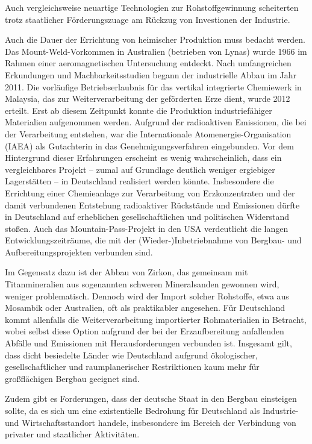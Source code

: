 \documentclass[12pt,a4paper,oneside]{book} %
\begin{document}
Auch vergleichsweise neuartige Technologien zur Rohstoffgewinnung scheiterten trotz staatlicher Förderungszuage am Rückzug von Investionen der Industrie.

Auch die Dauer der Errichtung von heimischer Produktion muss bedacht werden. Das Mount-Weld-Vorkommen in Australien (betrieben von Lynas) wurde 1966 im Rahmen einer aeromagnetischen Untersuchung entdeckt. Nach umfangreichen Erkundungen und Machbarkeitsstudien begann der industrielle Abbau im Jahr 2011. Die vorläufige Betriebserlaubnis für das vertikal integrierte Chemiewerk in Malaysia, das zur Weiterverarbeitung der geförderten Erze dient, wurde 2012 erteilt. Erst ab diesem Zeitpunkt konnte die Produktion industriefähiger Materialien aufgenommen werden. Aufgrund der radioaktiven Emissionen, die bei der Verarbeitung entstehen, war die Internationale Atomenergie-Organisation (IAEA) als Gutachterin in das Genehmigungsverfahren eingebunden. Vor dem Hintergrund dieser Erfahrungen erscheint es wenig wahrscheinlich, dass ein vergleichbares Projekt – zumal auf Grundlage deutlich weniger ergiebiger Lagerstätten – in Deutschland realisiert werden könnte. Insbesondere die Errichtung einer Chemieanlage zur Verarbeitung von Erzkonzentraten und der damit verbundenen Entstehung radioaktiver Rückstände und Emissionen dürfte in Deutschland auf erheblichen gesellschaftlichen und politischen Widerstand stoßen. Auch das Mountain-Pass-Projekt in den USA verdeutlicht die langen Entwicklungszeiträume, die mit der (Wieder-)Inbetriebnahme von Bergbau- und Aufbereitungsprojekten verbunden sind.

Im Gegensatz dazu ist der Abbau von Zirkon, das gemeinsam mit Titanmineralien aus sogenannten schweren Mineralsanden gewonnen wird, weniger problematisch. Dennoch wird der Import solcher Rohstoffe, etwa aus Mosambik oder Australien, oft als praktikabler angesehen. Für Deutschland kommt allenfalls die Weiterverarbeitung importierter Rohmaterialien in Betracht, wobei selbst diese Option aufgrund der bei der Erzaufbereitung anfallenden Abfälle und Emissionen mit Herausforderungen verbunden ist. Insgesamt gilt, dass dicht besiedelte Länder wie Deutschland aufgrund ökologischer, gesellschaftlicher und raumplanerischer Restriktionen kaum mehr für großflächigen Bergbau geeignet sind.

Zudem gibt es Forderungen, dass der deutsche Staat in den Bergbau einsteigen sollte, da es sich um eine existentielle Bedrohung für Deutschland als Industrie- und Wirtschaftsstandort handele, insbesondere im Bereich der Verbindung von privater und staatlicher Aktivitäten.\autocite{https://www.africa-business-guide.de/de/praxis/erfahrungen/schluesselrolle-afrikas-bedeutung-bei-den-kritischen-rohstoffen--1920084}
\end{document}
